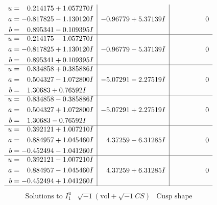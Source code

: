 \documentclass[1p]{elsarticle_modified}
\theoremstyle{definition}
\newcommand{\I}{\sqrt{-1}}
\begin{document}
$$\begin{array}{c|c|c}
\begin{aligned}
u &= \phantom{-}0.214175 + 1.057270 I \\
a &= -0.817825 - 1.130120 I \\
b &= \phantom{-}0.895341 - 0.109395 I\end{aligned}
 & -0.96779 + 5.37139 I & \phantom{-0.000000 } 0 \\ \hline\begin{aligned}
u &= \phantom{-}0.214175 - 1.057270 I \\
a &= -0.817825 + 1.130120 I \\
b &= \phantom{-}0.895341 + 0.109395 I\end{aligned}
 & -0.96779 - 5.37139 I & \phantom{-0.000000 } 0 \\ \hline\begin{aligned}
u &= \phantom{-}0.834858 + 0.385886 I \\
a &= \phantom{-}0.504327 - 1.072800 I \\
b &= \phantom{-}1.30683 + 0.76592 I\end{aligned}
 & -5.07291 - 2.27519 I & \phantom{-0.000000 } 0 \\ \hline\begin{aligned}
u &= \phantom{-}0.834858 - 0.385886 I \\
a &= \phantom{-}0.504327 + 1.072800 I \\
b &= \phantom{-}1.30683 - 0.76592 I\end{aligned}
 & -5.07291 + 2.27519 I & \phantom{-0.000000 } 0 \\ \hline\begin{aligned}
u &= \phantom{-}0.392121 + 1.007210 I \\
a &= \phantom{-}0.884957 + 1.045460 I \\
b &= -0.452494 - 1.041260 I\end{aligned}
 & \phantom{-}4.37259 - 6.31285 I & \phantom{-0.000000 } 0 \\ \hline\begin{aligned}
u &= \phantom{-}0.392121 - 1.007210 I \\
a &= \phantom{-}0.884957 - 1.045460 I \\
b &= -0.452494 + 1.041260 I\end{aligned}
 & \phantom{-}4.37259 + 6.31285 I & \phantom{-0.000000 } 0\\
 \hline 
 \end{array}$$\newpage$$\begin{array}{c|c|c}  
\text{Solutions to }I^u_{1}& \I (\text{vol} + \sqrt{-1}CS) & \text{Cusp shape}\\

\end{array}$$
\end{document}
